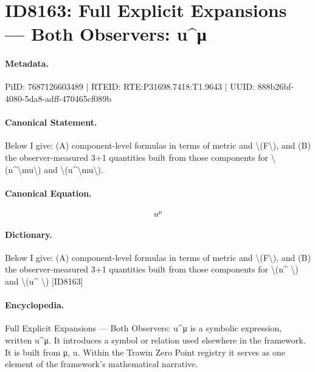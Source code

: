 \section*{ID8163: Full Explicit Expansions — Both Observers: u\textasciicircum{}μ}
\paragraph{Metadata.}
PiID: 7687126603489 | RTEID: RTE:P31698.7418:T1.9643 | UUID: 888b26bf-4080-5da8-adff-470465cf089b

\paragraph{Canonical Statement.}
Below I give: (A) component-level formulas in terms of metric and \textbackslash{}(F\textbackslash{}), and (B) the observer-measured 3+1 quantities built from those components for \textbackslash{}(n\textasciicircum{}\textbackslash{}mu\textbackslash{}) and \textbackslash{}(u\textasciicircum{}\textbackslash{}mu\textbackslash{}).

\paragraph{Canonical Equation.}
\[
u^\mu
\]

\paragraph{Dictionary.}
Below I give: (A) component-level formulas in terms of metric and \textbackslash{}(F\textbackslash{}), and (B) the observer-measured 3+1 quantities built from those components for \textbackslash{}(n\textasciicircum{} \textbackslash{}) and \textbackslash{}(u\textasciicircum{} \textbackslash{}) [ID8163]

\paragraph{Encyclopedia.}
Full Explicit Expansions — Both Observers: u\textasciicircum{}μ is a symbolic expression, written u\textasciicircum{}μ. It introduces a symbol or relation used elsewhere in the framework. It is built from μ, u. Within the Trawin Zero Point registry it serves as one element of the framework's mathematical narrative.
